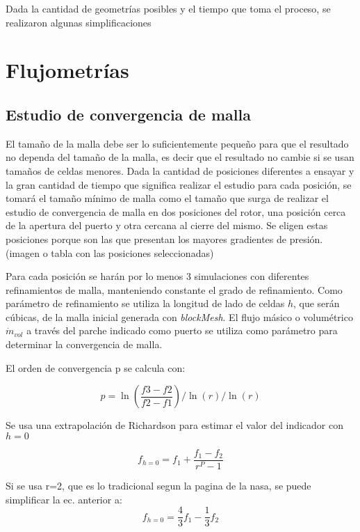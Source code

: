 Dada la cantidad de geometrías posibles y el tiempo que toma el proceso, se
realizaron algunas simplificaciones


\section{Flujometrías}

\subsection{Estudio de convergencia de malla}

El tamaño de la malla debe ser lo suficientemente pequeño para que el resultado
no dependa del tamaño de la malla, es decir que el resultado no cambie si se
usan tamaños de celdas menores.
%
Dada la cantidad de posiciones diferentes a ensayar y la gran cantidad de
tiempo que significa realizar el estudio para cada posición, se tomará el
tamaño mínimo de malla como el tamaño que surga de realizar el estudio de
convergencia de malla en dos posiciones del rotor, una posición cerca de la
apertura del puerto y otra cercana al cierre del mismo.
%
Se eligen estas posiciones porque son las que presentan los mayores gradientes
de presión.
(imagen o tabla con las posiciones seleccionadas)


Para cada posición se harán por lo menos 3 simulaciones con diferentes
refinamientos de malla, manteniendo constante el grado de refinamiento.
%
Como parámetro de refinamiento se utiliza la longitud de lado de celdas $h$,
que serán cúbicas, de la malla inicial generada con \emph{blockMesh}.
%
El flujo másico o volumétrico $\dot{m}_{vol}$ a través del parche indicado como
puerto se utiliza como parámetro para determinar la convergencia de malla.

El orden de convergencia p se calcula con:

$$ p = \ln \left( \frac{f3 - f2} {f2 - f1} \right) / \ln(r) / \ln(r) $$

Se usa una extrapolación de Richardson para estimar el valor del indicador con
$h = 0$

$$ f_{h=0} = f_{1} + \frac{f_1 - f_2}{r^P - 1} $$

Si se usa r=2, que es lo tradicional segun la pagina de la nasa, se puede
simplificar la ec. anterior a:
$$ f_{h=0} = \frac{4}{3}f_{1} - \frac{1}{3}f_2 $$

